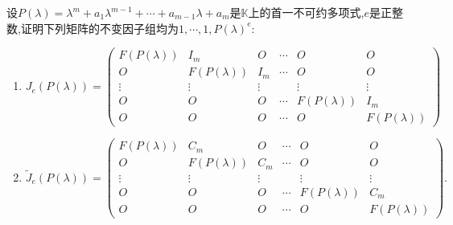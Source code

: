 \documentclass[../../main.tex]{subfiles}%
\begin{document}
\begin{proposition}\label{proposition:广义标准型相关结论}
设$P(\lambda)=\lambda^m + a_1\lambda^{m - 1}+\cdots + a_{m - 1}\lambda + a_m$是$\mathbb{K}$上的首一不可约多项式,$e$是正整数,证明下列矩阵的不变因子组均为$1,\cdots,1,P(\lambda)^e$:
\begin{enumerate}[(1)]
\item $J_e(P(\lambda)) = 
\begin{pmatrix}
F(P(\lambda)) & I_m & O & \cdots & O & O \\
O & F(P(\lambda)) & I_m & \cdots & O & O \\
\vdots & \vdots & \vdots & & \vdots & \vdots \\
O & O & O & \cdots & F(P(\lambda)) & I_m \\
O & O & O & \cdots & O & F(P(\lambda))
\end{pmatrix}$

\item $\widetilde{J}_e(P(\lambda)) = 
\begin{pmatrix}
F(P(\lambda)) & C_m & O & \cdots & O & O \\
O & F(P(\lambda)) & C_m & \cdots & O & O \\
\vdots & \vdots & \vdots & & \vdots & \vdots \\
O & O & O & \cdots & F(P(\lambda)) & C_m \\
O & O & O & \cdots & O & F(P(\lambda))
\end{pmatrix}.$
\end{enumerate}
\end{proposition}
\end{document}
